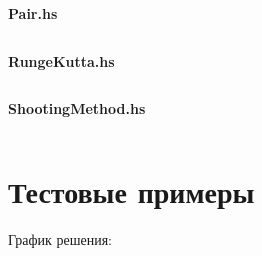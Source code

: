 \documentclass[a4paper,12pt]{article}
\begin{document}
\textbf{Pair.hs}
\inputminted[breaklines]{haskell}{../src/Pair.hs}

\textbf{RungeKutta.hs}
\inputminted[breaklines]{haskell}{../src/RungeKutta.hs}

\textbf{ShootingMethod.hs}
\inputminted[breaklines]{haskell}{../src/ShootingMethod.hs}
\pagebreak
\section{\normalsize{Тестовые примеры}}
\begin{flushleft}
  График решения:\linebreak
\end{flushleft}
\begin{figure}[h]
  \centering
  \def\svgwidth{\columnwidth}
  
\end{figure}
\end{document}
